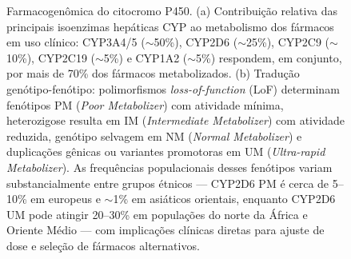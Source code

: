 \begin{figure}[ht]
\caption{Farmacogenômica do citocromo P450. (a) Contribuição relativa das principais isoenzimas hepáticas CYP ao metabolismo dos fármacos em uso clínico: CYP3A4/5 (\(\sim\)50\%), CYP2D6 (\(\sim\)25\%), CYP2C9 (\(\sim\)10\%), CYP2C19 (\(\sim\)5\%) e CYP1A2 (\(\sim\)5\%) respondem, em conjunto, por mais de 70\% dos fármacos metabolizados. (b) Tradução genótipo-fenótipo: polimorfismos \emph{loss-of-function} (LoF) determinam fenótipos PM (\emph{Poor Metabolizer}) com atividade mínima, heterozigose resulta em IM (\emph{Intermediate Metabolizer}) com atividade reduzida, genótipo selvagem em NM (\emph{Normal Metabolizer}) e duplicações gênicas ou variantes promotoras em UM (\emph{Ultra-rapid Metabolizer}). As frequências populacionais desses fenótipos variam substancialmente entre grupos étnicos --- CYP2D6 PM é cerca de 5--10\% em europeus e \(\sim\)1\% em asiáticos orientais, enquanto CYP2D6 UM pode atingir 20--30\% em populações do norte da África e Oriente Médio --- com implicações clínicas diretas para ajuste de dose e seleção de fármacos alternativos.}
\label{fig:13-cyp}
\end{figure}

